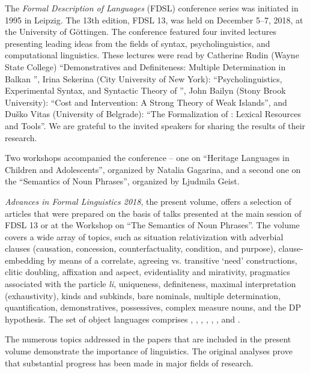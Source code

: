 % 
%
% 

The \textit{Formal Description of  Languages} (FDSL) conference series was initiated in 1995 in Leipzig. The 13th edition, FDSL 13, was held on December 5--7, 2018, at the University of Göttingen. The conference featured four invited lectures presenting leading ideas from the fields of syntax, psycholinguistics, and computational linguistics. These lectures were read by Catherine Rudin (Wayne State College) ``Demonstratives and Definiteness: Multiple Determination in Balkan '', Irina Sekerina (City University of New York): ``Psycholinguistics, Experimental Syntax, and Syntactic Theory of '', John Bailyn (Stony Brook University): ``Cost and Intervention: A Strong Theory of Weak Islands'', and Duško Vitas (University of Belgrade): ``The Formalization of : Lexical Resources and Tools''. We are grateful to the invited speakers for sharing the results of their research.

Two workshops accompanied the conference -- one on ``Heritage  Languages in Children and Adolescents'', organized by Natalia Gagarina, and a second one on the ``Semantics of Noun Phrases'', organized by Ljudmila Geist.

\textit{Advances in Formal  Linguistics 2018}, the present volume, offers a selection of articles that were prepared on the basis of talks presented at the main session of FDSL 13 or at the Workshop on ``The Semantics of Noun Phrases''. The volume covers a wide array of topics, such as situation relativization with adverbial clauses (causation, concession, counterfactuality, condition, and purpose), clause-embedding by means of a correlate, agreeing vs. transitive `need' constructions, clitic doubling, affixation and aspect, evidentiality and mirativity, pragmatics associated with the particle \textit{li}, uniqueness, definiteness, maximal interpretation (exhaustivity), kinds and subkinds, bare nominals, multiple determination, quantification, demonstratives, possessives, complex measure nouns, and the DP hypothesis. The set of object languages comprises , , , , , , and  .

The numerous topics addressed in the papers that are included in the present volume demonstrate the importance of  linguistics. The original analyses prove that substantial progress has been made in major fields of research.

